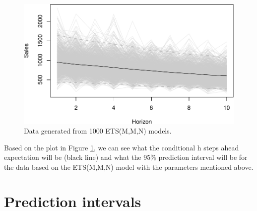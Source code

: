 \documentclass[
]{book}
\theoremstyle{definition}
\theoremstyle{definition}
\theoremstyle{definition}
\theoremstyle{definition}
\theoremstyle{remark}
\begin{document}
\begin{figure}
\centering
\includegraphics{adam_files/figure-latex/adamForecastSimulated-1.pdf}
\caption{\label{fig:adamForecastSimulated}Data generated from 1000 ETS(M,M,N) models.}
\end{figure}

Based on the plot in Figure \ref{fig:adamForecastSimulated}, we can see what the conditional h steps ahead expectation will be (black line) and what the 95\% prediction interval will be for the data based on the ETS(M,M,N) model with the parameters mentioned above.

\hypertarget{ADAMForecastingPI}{%
\section{Prediction intervals}\label{ADAMForecastingPI}}
\end{document}
